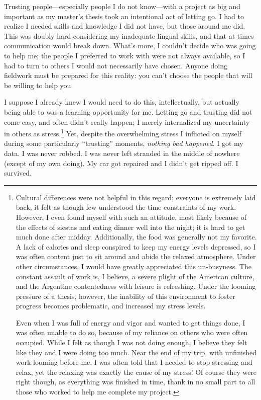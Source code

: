 Trusting people—especially people I do not know—with a project as big and important as my master’s thesis took an intentional act of letting go. I had to realize I needed skills and knowledge I did not have, but those around me did. This was doubly hard considering my inadequate lingual skills, and that at times communication would break down. What’s more, I couldn’t decide who was going to help me; the people I preferred to work with were not always available, so I had to turn to others I would not necessarily have chosen. Anyone doing fieldwork must be prepared for this reality: you can’t choose the people that will be willing to help you.

I suppose I already knew I would need to do this, intellectually, but actually being able to was a learning opportunity for me. Letting go and trusting did not come easy, and often didn’t really happen; I merely internalized my uncertainty in others as stress.\footnote{Cultural differences were not helpful in this regard; everyone is extremely laid back; it felt as though few understood the time constraints of my work. However, I even found myself with such an attitude, most likely because of the effects of siestas and eating dinner well into the night; it is hard to get much done after midday. Additionally, the food was generally not my favorite. A lack of calories and sleep conspired to keep my energy levels depressed, so I was often content just to sit around and abide the relaxed atmosphere. Under other circumstances, I would have greatly appreciated this un-busyness. The constant assault of work is, I believe, a severe plight of the American culture, and the Argentine contentedness with leisure is refreshing. Under the looming pressure of a thesis, however, the inability of this environment to foster progress becomes problematic, and increased my stress levels.

Even when I was full of energy and vigor and wanted to get things done, I was often unable to do so, because of my reliance on others who were often occupied. While I felt as though I was not doing enough, I believe they felt like they and I were doing too much. Near the end of my trip, with unfinished work looming before me, I was often told that I needed to stop stressing and relax, yet the relaxing was exactly the cause of my stress! Of course they were right though, as everything was finished in time, thank in no small part to all those who worked to help me complete my project.} Yet, despite the overwhelming stress I inflicted on myself during some particularly “trusting” moments, \textit{nothing bad happened}. I got my data. I was never robbed. I was never left stranded in the middle of nowhere (except of my own doing). My car got repaired and I didn't get ripped off. I survived.

